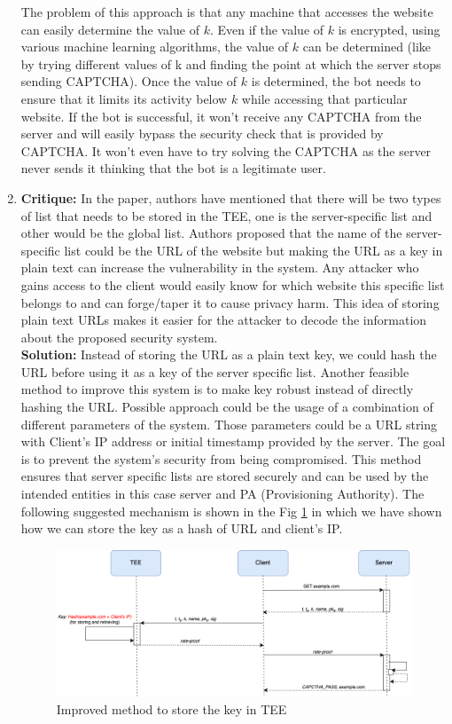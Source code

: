 \begin{enumerate}
	The problem of this approach is that any machine that accesses the website can easily determine the value of $k$. Even if the value of $k$ is encrypted, using various machine learning algorithms, the value of $k$ can be determined (like by trying different values of k and finding the point at which the server stops sending CAPTCHA). Once the value of $k$ is determined, the bot needs to ensure that it limits its activity below $k$ while accessing that particular website. If the bot is successful, it won't receive any CAPTCHA from the server and will easily bypass the security check that is provided by CAPTCHA. It won't even have to try solving the CAPTCHA as the server never sends it thinking that the bot is a legitimate user.

	\item \textbf{Critique:} In the paper, authors have mentioned that there will be two types of list that needs to be stored in the TEE, one is the server-specific list and other would be the global list. Authors proposed that the name of the server-specific list could be the URL of the website but making the URL as a key in plain text can increase the vulnerability in the system. Any attacker who gains access to the client would easily know for which  website this specific list belongs to and can forge/taper it to cause privacy harm. This idea of storing plain text URLs makes it easier for the attacker to decode the information about the proposed security system.\\

	\textbf{Solution:} Instead of storing the URL as a plain text key, we could hash the URL before using it as a key of the server specific list. Another feasible method to improve this system is to make key robust instead of directly hashing the URL. Possible approach could be the usage of a combination of different parameters of the system. Those parameters could be a URL string with Client’s IP address or initial timestamp provided by the server. The goal is to prevent the system's security from being compromised. This method ensures that server specific lists are stored securely and can be used by the intended entities in this case server and PA (Provisioning Authority). The following suggested mechanism is shown in the Fig \ref{fig:hasfig} in which we have shown how we can store the key as a hash of URL and client’s IP.\\

	\begin{figure}[h]
		\centering
		\includegraphics[scale=0.35]{./imgs/hash_diag.png}
		\caption{Improved method to store the key in TEE}
		\label{fig:hasfig}
	\end{figure}


\end{enumerate}
